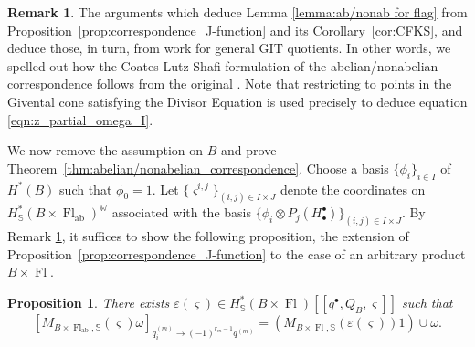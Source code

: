 \documentclass[a4paper,12pt]{amsart}
\numberwithin{equation}{section}
\newtheorem{proposition}[theorem]{Proposition}
\theoremstyle{definition}
\newtheorem{remark}[theorem]{Remark}
\newcommand{\bbS}{\mathbb{S}}
\newcommand{\W}{\mathbb{W}}
\newcommand{\newsigma}{\varsigma}
\newcommand{\Fl}{\operatorname{Fl}}
\newcommand{\FlG}{\operatorname{Fl}}
\newcommand{\FlT}{\operatorname{Fl}_{\operatorname{ab}}}
\begin{document}
\begin{remark} \label{rem:CFKS implies CLS}
    The arguments which deduce Lemma \ref{lemma:ab/nonab for flag} from Proposition~\ref{prop:correspondence_J-function} and its Corollary~\ref{cor:CFKS}, and deduce those, in turn, from \cite[Theorem 4.1.1]{CFKS} work for general GIT quotients. In other words, we spelled out how the Coates-Lutz-Shafi formulation \cite[Conjecture 1.8]{CLS} of the abelian/nonabelian correspondence follows from the original \cite[Conjecture 3.7.1]{CFKS}.
    Note that restricting to points in the Givental cone satisfying the Divisor Equation is used precisely to deduce equation \eqref{eqn:z_partial_omega_I}.
\end{remark}

We now remove the assumption on $B$ and prove Theorem~\ref{thm:abelian/nonabelian_correspondence}.
Choose a basis $\{\phi_i\}_{i\in I}$ of $H^*(B)$ such that $\phi_0=1$.
Let $\{\newsigma^{i,j}\}_{(i,j)\in I\times J}$ denote the coordinates on $H^*_\bbS(B\times\FlT)^\W$ associated with the basis $\{\phi_i\otimes P_j(H^\bullet_\bullet)\}_{(i,j)\in I\times J}$.
By Remark \ref{rem:CFKS implies CLS}, it suffices to show the following proposition, the extension of Proposition~\ref{prop:correspondence_J-function} to the case of an arbitrary product $B\times\Fl$.

\begin{proposition}\label{prop:correspondence_J-function_product}
    There exists $\varepsilon(\newsigma)\in H^*_\bbS(B\times\Fl)[\![q^\bullet,Q_B,\newsigma]\!]$ such that 
    \begin{equation}\label{eqn:correspondence_J-function_product}
        [M_{B\times\FlT,\bbS}(\newsigma)\omega]_{q^{(m)}_i\to(-1)^{r_m-1} q^{(m)}} = (M_{B\times\FlG,\bbS}(\varepsilon(\newsigma))1) \cup \omega.
    \end{equation} 
\end{proposition}
\end{document}

